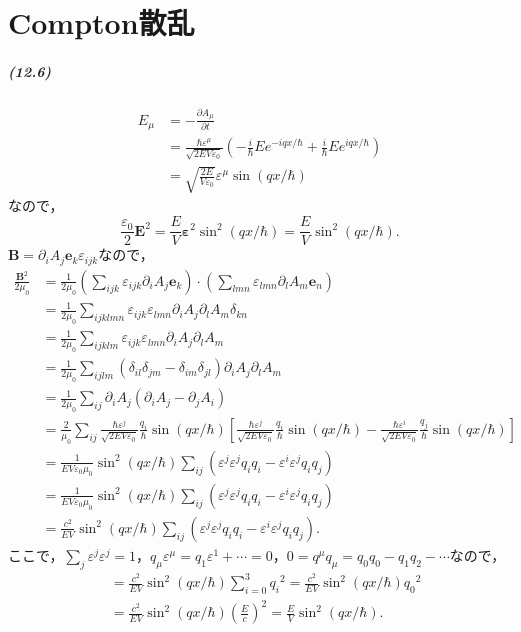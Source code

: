 \chapter{Compton散乱}
\paragraph{(12.6)}
\begin{align*}
  E_\mu & = -\frac{\partial A_\mu}{\partial t}\\
  & = \frac{\hbar\varepsilon^\mu}{\sqrt{2EV\varepsilon_0}}\left(-\frac{i}{\hbar}Ee^{-iqx/\hbar}+\frac{i}{\hbar}Ee^{iqx/\hbar}\right)\\
  & = \sqrt{\frac{2E}{V\varepsilon_0}}\varepsilon^\mu\sin(qx/\hbar)
\end{align*}
なので，
\[\frac{\varepsilon_0}{2}\boldsymbol{E}^2=\frac{E}{V}\boldsymbol{\varepsilon}^2\sin^2(qx/\hbar)=\frac{E}{V}\sin^2(qx/\hbar).\]
$\boldsymbol{B}=\partial_iA_j\boldsymbol{e}_k\varepsilon_{ijk}$なので，
\begin{align*}
  \frac{\boldsymbol{B}^2}{2\mu_0} & = \frac{1}{2\mu_0}\left(\sum_{ijk}\varepsilon_{ijk}\partial_iA_j\boldsymbol{e}_k\right)\cdot\left(\sum_{lmn}\varepsilon_{lmn}\partial_lA_m\boldsymbol{e}_n\right)\\
  & = \frac{1}{2\mu_0}\sum_{ijklmn}\varepsilon_{ijk}\varepsilon_{lmn}\partial_iA_j\partial_lA_m\delta_{kn}\\
  & = \frac{1}{2\mu_0}\sum_{ijklm}\varepsilon_{ijk}\varepsilon_{lmn}\partial_iA_j\partial_lA_m\\
  & = \frac{1}{2\mu_0}\sum_{ijlm}(\delta_{il}\delta_{jm}-\delta_{im}\delta_{jl})\partial_iA_j\partial_lA_m\\
  & = \frac{1}{2\mu_0}\sum_{ij}\partial_iA_j(\partial_iA_j-\partial_jA_i)\\
  & = \frac{2}{\mu_0}\sum_{ij}\frac{\hbar\varepsilon^j}{\sqrt{2EV\varepsilon_0}}\frac{q_i}{\hbar}\sin(qx/\hbar)\left[\frac{\hbar\varepsilon^j}{\sqrt{2EV\varepsilon_0}}\frac{q_i}{\hbar}\sin(qx/\hbar)-\frac{\hbar\varepsilon^i}{\sqrt{2EV\varepsilon_0}}\frac{q_j}{\hbar}\sin(qx/\hbar)\right]\\
  & = \frac{1}{EV\varepsilon_0\mu_0}\sin^2(qx/\hbar)\sum_{ij}(\varepsilon^j\varepsilon^jq_iq_i-\varepsilon^i\varepsilon^jq_iq_j)\\
  & = \frac{1}{EV\varepsilon_0\mu_0}\sin^2(qx/\hbar)\sum_{ij}(\varepsilon^j\varepsilon^jq_iq_i-\varepsilon^i\varepsilon^jq_iq_j)\\
  & = \frac{c^2}{EV}\sin^2(qx/\hbar)\sum_{ij}(\varepsilon^j\varepsilon^jq_iq_i-\varepsilon^i\varepsilon^jq_iq_j).
\end{align*}
ここで，$\sum_j\varepsilon^j\varepsilon^j=1$，$q_\mu\varepsilon^\mu=q_1\varepsilon^1+\cdots=0$，$0=q^\mu q_\mu=q_0q_0-q_1q_2-\cdots$なので，
\begin{align*}
  & = \frac{c^2}{EV}\sin^2(qx/\hbar)\sum_{i=0}^3q_i{}^2 = \frac{c^2}{EV}\sin^2(qx/\hbar)q_0{}^2\\
  & = \frac{c^2}{EV}\sin^2(qx/\hbar)(\frac{E}{c})^2 = \frac{E}{V}\sin^2(qx/\hbar).
\end{align*}

